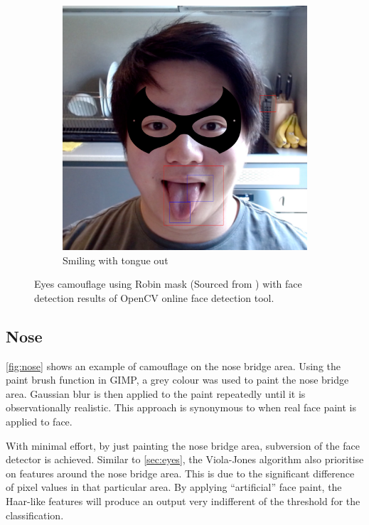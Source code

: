 \documentclass[10pt,twocolumn,letterpaper]{article}
\begin{document}
\begin{figure}[t]
\begin{subfigure}[b]{.49\linewidth}
        \includegraphics[width=\linewidth]{Figures/eyes_3.png}
        \caption{Smiling with tongue out}
    \end{subfigure}
    
    \caption{Eyes camouflage using Robin mask (Sourced from \cite{robin}) with face detection results of OpenCV online face detection tool.}
    \label{fig:eyes}
\end{figure}


\subsection{Nose}

\cref{fig:nose} shows an example of camouflage on the nose bridge area. Using the paint brush function in GIMP, a grey colour was used to paint the nose bridge area. Gaussian blur is then applied to the paint repeatedly until it is observationally realistic. This approach is synonymous to when real face paint is applied to face.

With minimal effort, by just painting the nose bridge area, subversion of the face detector is achieved. Similar to \cref{sec:eyes}, the Viola-Jones algorithm also prioritise on features around the nose bridge area. This is due to the significant difference of pixel values in that particular area. By applying ``artificial'' face paint, the Haar-like features will produce an output very indifferent of the threshold for the classification.
\end{document}
